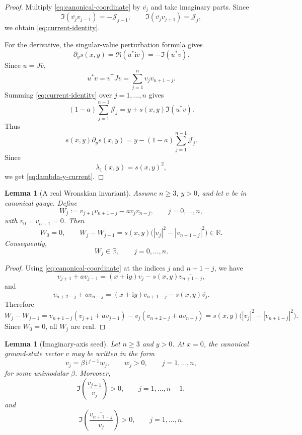 \documentclass[11pt]{amsart}
\numberwithin{equation}{section}
\newcommand{\R}{\mathbb R}
\newcommand{\ii}{\mathrm i}
\newtheorem{lemma}[theorem]{Lemma}
\begin{document}
\begin{proof}
Multiply \eqref{eq:canonical-coordinate} by \(\overline{v_j}\) and take imaginary parts.  Since
\[
\Im(\overline{v_j}v_{j-1})=-\mathcal J_{j-1},
\qquad
\Im(\overline{v_j}v_{j+1})=\mathcal J_j,
\]
we obtain \eqref{eq:current-identity}.

For the derivative, the singular-value perturbation formula gives
\[
\partial_y s(x,y)
=
\Re(u^*\ii v)
=
-\Im(u^*v).
\]
Since \(u=J\overline v\),
\[
u^*v
=
v^{\mathsf T}Jv
=
\sum_{j=1}^n v_jv_{n+1-j}.
\]
Summing \eqref{eq:current-identity} over \(j=1,\dots,n\) gives
\[
(1-a)\sum_{j=1}^{n-1}\mathcal J_j
=
y+s(x,y)\Im(u^*v).
\]
Thus
\[
s(x,y)\partial_y s(x,y)
=
y-(1-a)\sum_{j=1}^{n-1}\mathcal J_j.
\]
Since
\[
\lambda_1(x,y)=s(x,y)^2,
\]
we get \eqref{eq:lambda-y-current}.
\end{proof}

\begin{lemma}[A real Wronskian invariant]\label{lem:real-wronskian}
Assume \(n\ge3\), \(y>0\), and let \(v\) be in canonical gauge.  Define
\[
W_j:=v_{j+1}v_{n+1-j}-av_jv_{n-j},
\qquad
j=0,\dots,n,
\]
with \(v_0=v_{n+1}=0\).  Then
\[
W_0=0,
\qquad
W_j-W_{j-1}
=
s(x,y)\bigl(|v_j|^2-|v_{n+1-j}|^2\bigr)\in\R.
\]
Consequently,
\[
W_j\in\R,
\qquad
j=0,\dots,n.
\]
\end{lemma}

\begin{proof}
Using \eqref{eq:canonical-coordinate} at the indices \(j\) and \(n+1-j\), we have
\[
v_{j+1}+av_{j-1}
=
(x+\ii y)v_j-s(x,y)\overline{v_{n+1-j}},
\]
and
\[
v_{n+2-j}+av_{n-j}
=
(x+\ii y)v_{n+1-j}-s(x,y)\overline{v_j}.
\]
Therefore
\[
W_j-W_{j-1}
=
v_{n+1-j}(v_{j+1}+av_{j-1})
-
v_j(v_{n+2-j}+av_{n-j})
=
s(x,y)\bigl(|v_j|^2-|v_{n+1-j}|^2\bigr).
\]
Since \(W_0=0\), all \(W_j\) are real.
\end{proof}

\begin{lemma}[Imaginary-axis seed]\label{lem:imaginary-axis-seed}
Let \(n\ge3\) and \(y>0\).  At \(x=0\), the canonical ground-state vector \(v\) may be written in the form
\[
v_j=\beta\,\ii^{\,j-1}w_j,
\qquad
w_j>0,
\qquad
j=1,\dots,n,
\]
for some unimodular \(\beta\).  Moreover,
\[
\Im\left(\frac{v_{j+1}}{v_j}\right)>0,
\qquad
j=1,\dots,n-1,
\]
and
\[
\Im\left(\frac{\overline{v_{n+1-j}}}{v_j}\right)>0,
\qquad
j=1,\dots,n.
\]
\end{lemma}
\end{document}
